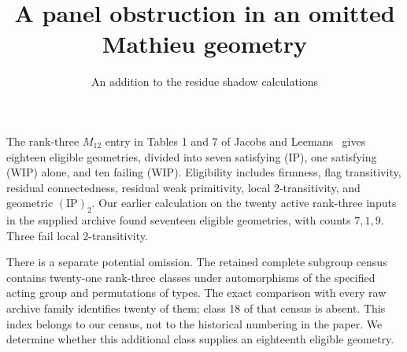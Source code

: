 \documentclass[11pt,a4paper]{article}
\title{A panel obstruction in an omitted Mathieu geometry}
\author{An addition to the residue shadow calculations}
\date{}
\begin{document}
\maketitle
The rank-three $M_{12}$ entry in Tables 1 and 7 of Jacobs and
Leemans~\cite{source} gives eighteen eligible geometries, divided into
seven satisfying (IP), one satisfying (WIP) alone, and ten failing
(WIP). Eligibility includes firmness, flag transitivity, residual
connectedness, residual weak primitivity, local 2-transitivity, and
geometric $(\mathrm{IP})_2$. Our earlier calculation on the twenty active
rank-three inputs in the supplied archive found seventeen eligible
geometries, with counts $7,1,9$. Three fail local 2-transitivity.

There is a separate potential omission. The retained complete subgroup
census contains twenty-one rank-three classes under automorphisms of
the specified acting group and permutations of types. The exact
comparison with every raw archive family identifies twenty of them;
class 18 of that census is absent. This index belongs to our census,
not to the historical numbering in the paper. We determine whether
this additional class supplies an eighteenth eligible geometry.
\end{document}
